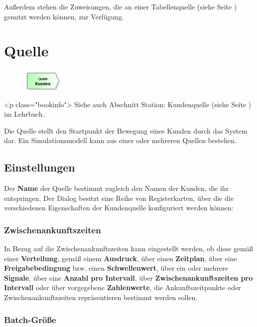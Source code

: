 Außerdem stehen die Zuweisungen, die an einer Tabellenquelle (siehe Seite \pageref{ref:ModelElementSourceTable}) genutzt werden können, zur Verfügung.


\section{Quelle}
\label{ref:ModelElementSource}

\begin{figure}
\vspace{-22pt}
\includegraphics[width=2cm]{imageModelElementSource.png}
\vspace{-22pt}
\end{figure}

<p class="bookinfo">
Siehe auch Abschnitt Station: Kundenquelle (siehe Seite \pageref{ref:book:5.3.1}) im Lehrbuch.

Die Quelle stellt den Startpunkt der Bewegung eines Kunden durch das System dar.
Ein Simulationsmodell kann aus einer oder mehreren Quellen bestehen.

\subsection*{Einstellungen}

Der \textbf{Name} der Quelle bestimmt zugleich den Namen der Kunden, die ihr entspringen.
Der Dialog besitzt eine Reihe von Registerkarten, über die die verschiedenen Eigenschaften
der Kundenquelle konfiguriert werden können:

\subsubsection*{Zwischenankunftszeiten}

In Bezug auf die Zwischenankunftszeiten kann eingestellt werden, ob diese gemäß einer
\textbf{Verteilung}, gemäß einem \textbf{Ausdruck}, über einen \textbf{Zeitplan}, über eine
\textbf{Freigabebedingung} bzw. einen \textbf{Schwellenwert}, über ein oder mehrere
\textbf{Signale}, über eine \textbf{Anzahl pro Intervall}, über \textbf{Zwischenankunftszeiten pro Intervall}
oder über vorgegebene \textbf{Zahlenwerte}, die Ankunftszeitpunkte oder Zwischenankunftszeiten
repräsentieren bestimmt werden sollen.

\subsubsection*{Batch-Größe}

